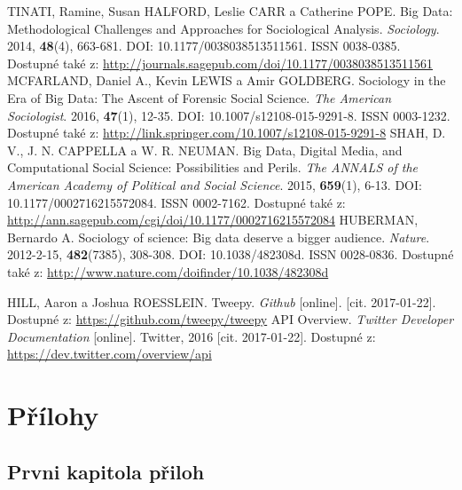 \documentclass[12pt, a4paper]{article}
\numberwithin{equation}{section} 	%
\begin{document}
\begin{thebibliography}{99}
    TINATI, Ramine, Susan HALFORD, Leslie CARR a Catherine POPE. Big Data: Methodological Challenges and Approaches for Sociological Analysis. \textit{Sociology}. 2014, \textbf{48}(4), 663-681. DOI: 10.1177/0038038513511561. ISSN 0038-0385. Dostupné také z: \url{http://journals.sagepub.com/doi/10.1177/0038038513511561}
    MCFARLAND, Daniel A., Kevin LEWIS a Amir GOLDBERG. Sociology in the Era of Big Data: The Ascent of Forensic Social Science. \textit{The American Sociologist}. 2016, \textbf{47}(1), 12-35. DOI: 10.1007/s12108-015-9291-8. ISSN 0003-1232. Dostupné také z: \url{http://link.springer.com/10.1007/s12108-015-9291-8}
    SHAH, D. V., J. N. CAPPELLA a W. R. NEUMAN. Big Data, Digital Media, and Computational Social Science: Possibilities and Perils. \textit{The ANNALS of the American Academy of Political and Social Science}. 2015, \textbf{659}(1), 6-13. DOI: 10.1177/0002716215572084. ISSN 0002-7162. Dostupné také z: \url{http://ann.sagepub.com/cgi/doi/10.1177/0002716215572084}
    HUBERMAN, Bernardo A. Sociology of science: Big data deserve a bigger audience. \textit{Nature}. 2012-2-15, \textbf{482}(7385), 308-308. DOI: 10.1038/482308d. ISSN 0028-0836. Dostupné také z: \url{http://www.nature.com/doifinder/10.1038/482308d}

    HILL, Aaron a Joshua ROESSLEIN. Tweepy. \textit{Github} [online]. [cit. 2017-01-22]. Dostupné z: \url{https://github.com/tweepy/tweepy}
    API Overview. \textit{Twitter Developer Documentation} [online]. Twitter, 2016 [cit. 2017-01-22]. Dostupné z: \url{https://dev.twitter.com/overview/api}



\end{thebibliography}

\newpage
\section*{Přílohy}
\subsection*{Prvni kapitola přiloh}
\noindent
\end{document}
